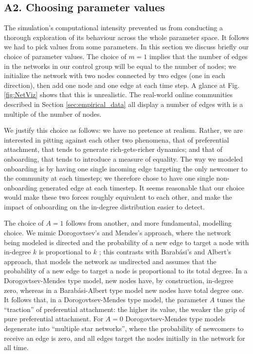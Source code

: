 \documentclass{bmcart}
\begin{document}
\subsection*{A2. Choosing parameter values}

The simulation's computational intensity prevented us from conducting a thorough exploration of its behaviour across the whole parameter space. It follows we had to pick values from some parameters. In this section we discuss briefly our choice of parameter values.
The choice of $m=1$ implies that the number of edges in the networks in our control group will be equal to the number of nodes; we initialize the network with two nodes connected by two edges (one in each direction), then add one node and one edge at each time step. A glance at  Fig.\,\ref{fig:NetViz} shows that this is unrealistic. The real-world online communities described in Section \ref{sec:empirical_data} all display a number of edges with is a multiple of the number of nodes. 

We justify this choice as follows: we have no pretence at realism. Rather, we are interested in pitting against each other two phenomena, that of preferential attachment, that tends to generate rich-gets-richer dynamics; and that of onboarding, that tends to introduce a measure of equality. The way we modeled onboarding is by having one single incoming edge targeting the only newcomer to the community at each timestep; we therefore chose to have one single non-onboarding generated edge at each timestep. It seems reasonable that our choice would make  these two forces roughly equivalent to each other, and make the impact of onboarding on the in-degree distribution easier to detect. 


The choice of $A=1$ follows from another, and more fundamental, modelling choice. We mimic Dorogovtsev's and Mendes's approach, where the network being modeled is directed and the probability of a new edge to target a node with in-degree $k$ is proportional to $k$ \cite{dorogovtsev2002evolution}; this contrasts with Barab\'asi's and Albert's approach, that models the network as undirected and assumes that the probability of a new edge to target a node is proportional to its total degree. In a Dorogovtsev-Mendes type model, new nodes have, by construction, in-degree zero, whereas in a Barab\'asi-Albert type model new nodes have total degree one. It follows that, in a Dorogovtsev-Mendes type model, the parameter $A$ tunes the ``traction'' of preferential attachment: the higher its value, the weaker the grip of pure preferential attachment. For $A=0$ Dorogovtsev-Mendes type models degenerate into ``multiple star networks'', where the probability of newcomers to receive an edge is zero, and all edges target the nodes initially in the network for all time. 
\end{document}
